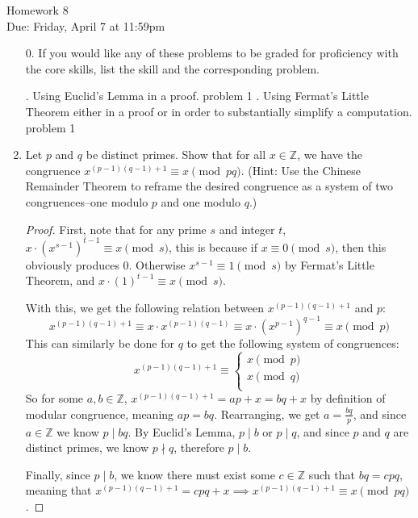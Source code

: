 \documentclass[11pt]{article}
\newcommand{\Z}{\mathbb{Z}}
\newcommand{\n}{\vspace{0.3cm}}
\begin{document}
\begin{center}
{\Large Homework 8}\\
Due: Friday,  April 7 at 11:59pm\\
\end{center}

\begin{enumerate}
\item[0.] If you would like any of these problems to be graded for proficiency with the core skills, list the skill and the corresponding problem. 
  \begin{outline}
    . Using Euclid’s Lemma in a proof.
      \2 problem 1
    . Using Fermat’s Little Theorem either in a proof or in order to substantially simplify a computation.
      \2 problem 1
  \end{outline} \n

\item Let $p$ and $q$ be distinct primes.  Show that for all $x \in \mathbb{Z}$, we have the congruence $x^{(p-1)(q-1)+1} \equiv x \pmod{pq}$.  (Hint: Use the Chinese Remainder Theorem to reframe the desired congruence as a system of two congruences--one modulo $p$ and one modulo $q$.)
  \begin{proof}
    First, note that for any prime \(s\) and integer \(t\), \(x \cdot \left(x^{s-1}\right)^{t-1} \equiv x \pmod s\), this is because if \(x \equiv 0 \pmod s\), then this obviously produces 0.  Otherwise \(x^{s-1} \equiv 1 \pmod s\) by Fermat's Little Theorem, and \(x \cdot (1)^{t-1} \equiv x \pmod s\).

    With this, we get the following relation between \(x^{(p-1)(q-1)+1}\) and \(p\):
    \[x^{(p-1)(q-1)+1} \equiv x \cdot x^{(p-1)(q-1)} \equiv x \cdot \left(x^{p-1}\right)^{q-1} \equiv x \pmod p\]
    This can similarly be done for \(q\) to get the following system of congruences:
    \[x^{(p-1)(q-1)+1} \equiv \begin{cases}
      x \pmod p \\
      x \pmod q \\
    \end{cases}\]
    So for some \(a,b \in \Z\), \(x^{(p-1)(q-1)+1} = ap+x = bq + x\) by definition of modular congruence, meaning \(ap = bq\).  Rearranging, we get \(a = \frac{bq}{p}\), and since \(a \in \Z\) we know \(p \mid bq\).  By Euclid's Lemma, \(p \mid b\) or \(p \mid q\), and since \(p\) and \(q\) are distinct primes, we know \(p \nmid q\), therefore \(p \mid b\).

    Finally, since \(p \mid b\), we know there must exist some \(c \in \Z\) such that \(bq = cpq\), meaning that \(x^{(p-1)(q-1)+1} = cpq + x \implies x^{(p-1)(q-1)+1} \equiv x \pmod{pq}\).
  \end{proof}
  


\end{enumerate}
\end{document}
